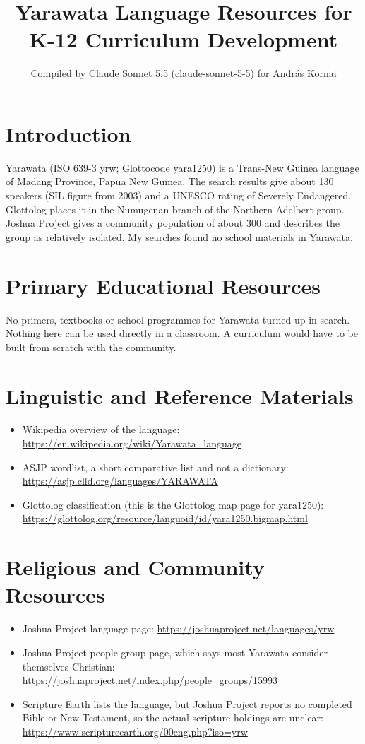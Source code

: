 \documentclass[12pt]{article}
\title{Yarawata Language Resources for K-12 Curriculum Development}
\author{Compiled by Claude Sonnet 5.5 (claude-sonnet-5-5) for Andr\'as Kornai}
\date{}
\begin{document}
\maketitle

\section{Introduction}
Yarawata (ISO 639-3 yrw; Glottocode yara1250) is a Trans-New Guinea language of Madang Province, Papua New Guinea. The search results give about 130 speakers (SIL figure from 2003) and a UNESCO rating of Severely Endangered. Glottolog places it in the Numugenan branch of the Northern Adelbert group. Joshua Project gives a community population of about 300 and describes the group as relatively isolated. My searches found no school materials in Yarawata.

\section{Primary Educational Resources}
No primers, textbooks or school programmes for Yarawata turned up in search. Nothing here can be used directly in a classroom. A curriculum would have to be built from scratch with the community.

\section{Linguistic and Reference Materials}
\begin{itemize}
\item Wikipedia overview of the language: \url{https://en.wikipedia.org/wiki/Yarawata_language}
\item ASJP wordlist, a short comparative list and not a dictionary: \url{https://asjp.clld.org/languages/YARAWATA}
\item Glottolog classification (this is the Glottolog map page for yara1250): \url{https://glottolog.org/resource/languoid/id/yara1250.bigmap.html}
\end{itemize}

\section{Religious and Community Resources}
\begin{itemize}
\item Joshua Project language page: \url{https://joshuaproject.net/languages/yrw}
\item Joshua Project people-group page, which says most Yarawata consider themselves Christian: \url{https://joshuaproject.net/index.php/people_groups/15993}
\item Scripture Earth lists the language, but Joshua Project reports no completed Bible or New Testament, so the actual scripture holdings are unclear: \url{https://www.scriptureearth.org/00eng.php?iso=yrw}
\end{itemize}
\end{document}

